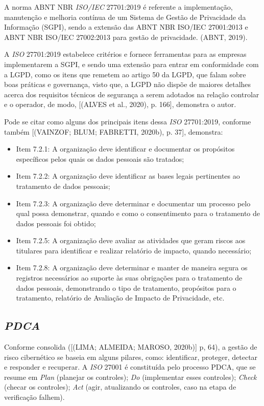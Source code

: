 \documentclass[
	12pt,				%
	openright,			%
	oneside,			%
	a4paper,			%
	english,			%
	french,				%
	spanish,			%
	brazil,				%
	]{abntex2}
\begin{document}
A norma ABNT NBR \textit{ISO/IEC} 27701:2019 é referente a implementação, manutenção e melhoria contínua de um Sistema de Gestão de Privacidade da Informação (SGPI), sendo a extensão das ABNT NBR ISO/IEC 27001:2013 e ABNT NBR ISO/IEC 27002:2013 para gestão de privacidade. (ABNT, 2019).

A \textit{ISO} 27701:2019 estabelece critérios e fornece ferramentas para as empresas implementarem a SGPI, e sendo uma extensão para entrar em conformidade com a LGPD, como os itens que remetem ao artigo 50 da LGPD, que falam sobre boas práticas e governança, visto que, a LGPD não dispõe de maiores detalhes acerca dos requisitos técnicos de segurança a serem adotados na relação controlar e o operador, de modo, [(ALVES et al., 2020), p. 166], demonstra o autor. 

 Pode se citar como alguns dos principais itens dessa \textit{ISO} 27701:2019, conforme também [(VAINZOF; BLUM; FABRETTI, 2020b), p. 37], demonstra:
\begin{itemize}
\item Item 7.2.1: A organização deve identificar e documentar os propósitos específicos pelos quais os dados pessoais são tratados;
\item Item 7.2.2: A organização deve identificar as bases legais pertinentes ao tratamento de dados pessoais;
\item Item 7.2.3: A organização deve determinar e documentar um processo pelo qual possa demonstrar, quando e como o consentimento para o  tratamento de dados pessoais foi obtido;
\item Item 7.2.5: A organização deve avaliar as atividades que geram riscos aos titulares para identificar e realizar relatório de impacto, quando necessário;
\item Item 7.2.8: A organização deve determinar e manter de maneira segura os registros necessários ao suporte às suas obrigações para o tratamento de dados pessoais, demonstrando o tipo de tratamento, propósitos para o tratamento, relatório de Avaliação de Impacto de Privacidade, etc.
\end{itemize}

\subsection{ \textit{PDCA} }

Conforme consolida ([(LIMA; ALMEIDA; MAROSO, 2020b)] p, 64), a gestão de risco cibernético se baseia em alguns pilares, como: identificar, proteger, detectar e responder e recuperar. A \textit{ISO} 27001 é constituída pelo processo PDCA, que se resume em \textit{Plan} (planejar os controles); \textit{Do} (implementar esses controles); \textit{Check} (checar os controles); \textit{Act} (agir, atualizando os controles, caso na etapa de verificação falhem).
\end{document}
